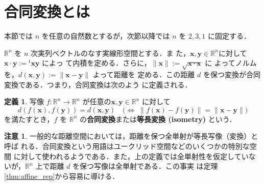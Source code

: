 \documentclass[11pt, uplatex, dvipdfmx, titlepage]{jsarticle}
\theoremstyle{definition}
\newtheorem*{definition}{定義}
\newtheorem*{remark}{注意}
\begin{document}
\newpage

\section{合同変換とは}\label{sec:whatis}

本節では $n$ を任意の自然数とするが，次節以降では $n$ を $2,3,1$ に固定する．

$\mathbb{R}^n$ を $n$ 次実列ベクトルのなす実線形空間とする．ま
た，$\bm{x}, \bm{y} \in
\mathbb{R}^n$に対して$\bm{x} \cdot \bm{y} := {}^{t}\bm{x} \bm{y}$ によっ
て内積を定める．さらに，$\| \bm{x}\| := \sqrt{\bm{x} \cdot \bm{x}}$ に
よってノルムを，$d(\bm{x}, \bm{y}) :=\|\bm{x} - \bm{y} \|$ よって距離を
定める．この距離 $d$ を保つ変換が合同変換である．つまり，合同変換は次のよう
に定義される．


\begin{definition}
  写像 $f:\mathbb{R}^n \to \mathbb{R}^n$
  が任意の$\bm{x}, \bm{y} \in \mathbb{R}^n$ に対して
  \[
    d(f(\bm{x}), f(\bm{y})) = d (\bm{x}, \bm{y}) \quad
    \Big( \Longleftrightarrow \;\|f(\bm{x}) - f(\bm{y})\| = \|\bm{x} - \bm{y}\| \Big)
  \]
  を満たすとき，$f$ を $\mathbb{R}^n$ の\textbf{合同変換}または\textbf{等長変換 (isometry)} という．
\end{definition}

\begin{remark}
  一般的な距離空間においては，距離を保つ全単射が等長写像（変換）と呼ば
  れる．合同変換という用語はユークリッド空間などのいくつかの特別な空間
  に対して使われるようである．また，上の定義では全単射性を仮定していな
  いが，$\mathbb{R}^n$ 上で距離 $d$ を保つ写像は全単射である．この事実
  は定理\ref{thm:affine_rep}から容易に導ける．
\end{remark}
\end{document}
